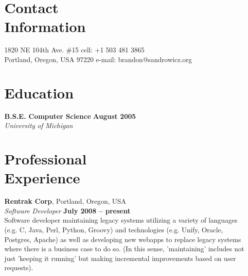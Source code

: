 \documentclass[margin,line]{resume}
\begin{document}
\begin{resume}

\section{\mysidestyle Contact\\Information}

1820 NE 104th Ave. \#15                 \hfill cell: +1 503 481 3865            \vspace{0mm}\\\vspace{0mm}%
Portland, Oregon, USA 97220             \hfill e-mail: brandon@sandrowicz.org   \vspace{0mm}\\\vspace{-4.5mm}%

\section{\mysidestyle Education}

\textbf{B.S.E. Computer Science} \hfill \textbf{August 2005}\vspace{1mm}\\\vspace{1mm}%
\textsl{University of Michigan}\vspace{-3mm}\\\vspace{-1mm}%

\section{\mysidestyle Professional\\Experience}

\textbf{Rentrak Corp}, Portland, Oregon, USA \vspace{2mm}\\
\textsl{Software Developer} \hfill \textbf{July 2008 -- present} \vspace{1mm}\\
Software developer maintaining legacy systems utilizing a variety of languages
(e.g. C, Java, Perl, Python, Groovy) and technologies (e.g. Unify, Oracle,
Postgres, Apache) as well as developing new webapps to replace legacy systems
where there is a business case to do so. (In this sense, 'maintaining' includes
not just 'keeping it running' but making incremental improvements based on user
requests).


\end{resume}
\end{document}
